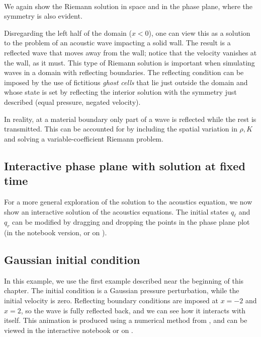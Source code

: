 \documentclass{SIAMbook2016}
\begin{document}
    \begin{center}
    \end{center}
    { \hspace*{\fill} \\}
    
We again show the Riemann solution in space and in the phase plane,
where the symmetry is also evident.

Disregarding the left half of the domain (\(x<0\)), one can view this as
a solution to the problem of an acoustic wave impacting a solid wall.
The result is a reflected wave that moves away from the wall; notice
that the velocity vanishes at the wall, as it must. This type of Riemann
solution is important when simulating waves in a domain with reflecting
boundaries. The reflecting condition can be imposed by the use of
fictitious \emph{ghost cells} that lie just outside the domain and whose
state is set by reflecting the interior solution with the symmetry just
described (equal pressure, negated velocity).

In reality, at a material boundary only part of a wave is reflected
while the rest is transmitted. This can be accounted for by including
the spatial variation in \(\rho, K\) and solving a variable-coefficient
Riemann problem.

\hypertarget{interactive-phase-plane-with-solution-at-fixed-time}{%
\subsection{Interactive phase plane with solution at fixed
time}\label{interactive-phase-plane-with-solution-at-fixed-time}}

For a more general exploration of the solution to the acoustics
equation, we now show an interactive solution of the acoustics
equations. The initial states \(q_\ell\) and \(q_r\) can be modified by
dragging and dropping the points in the phase plane plot (in the
notebook version, or on
).

\hypertarget{gaussian-initial-condition}{%
\subsection{Gaussian initial
condition}\label{gaussian-initial-condition}}

In this example, we use the first example described near the beginning
of this chapter. The initial condition is a Gaussian pressure
perturbation, while the initial velocity is zero. Reflecting boundary
conditions are imposed at \(x=-2\) and \(x=2\), so the wave is fully
reflected back, and we can see how it interacts with itself. This
animation is produced using a numerical method from
, and can be viewed in the
interactive notebook or on
.
\end{document}
